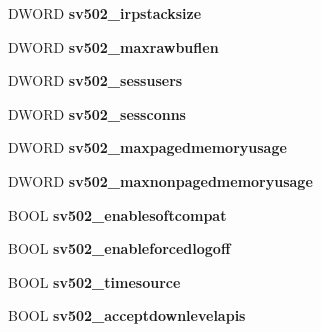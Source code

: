 \begin{DoxyCompactItemize}
D\+W\+O\+RD {\bfseries sv502\+\_\+irpstacksize}
\item 
\mbox{\label{struct___s_e_r_v_e_r___i_n_f_o__502_a532a9819ed0423fb32d903a3991dfd52}} 
D\+W\+O\+RD {\bfseries sv502\+\_\+maxrawbuflen}
\item 
\mbox{\label{struct___s_e_r_v_e_r___i_n_f_o__502_ae02cc028bba937cb16ce235fd617a5f8}} 
D\+W\+O\+RD {\bfseries sv502\+\_\+sessusers}
\item 
\mbox{\label{struct___s_e_r_v_e_r___i_n_f_o__502_af4893949173f745cb89d6b2ef33bbb17}} 
D\+W\+O\+RD {\bfseries sv502\+\_\+sessconns}
\item 
\mbox{\label{struct___s_e_r_v_e_r___i_n_f_o__502_a7daef994026d2732670121c437357ea5}} 
D\+W\+O\+RD {\bfseries sv502\+\_\+maxpagedmemoryusage}
\item 
\mbox{\label{struct___s_e_r_v_e_r___i_n_f_o__502_a8d734ac07ed07311243807cee91140a5}} 
D\+W\+O\+RD {\bfseries sv502\+\_\+maxnonpagedmemoryusage}
\item 
\mbox{\label{struct___s_e_r_v_e_r___i_n_f_o__502_a9693dab3f8fda9d6dc7cf4f2ef1ca65d}} 
B\+O\+OL {\bfseries sv502\+\_\+enablesoftcompat}
\item 
\mbox{\label{struct___s_e_r_v_e_r___i_n_f_o__502_a34eabd6a824c277587fa4ea98ce88aef}} 
B\+O\+OL {\bfseries sv502\+\_\+enableforcedlogoff}
\item 
\mbox{\label{struct___s_e_r_v_e_r___i_n_f_o__502_a7cac5986a3bf300db9f7336c58d58744}} 
B\+O\+OL {\bfseries sv502\+\_\+timesource}
\item 
\mbox{\label{struct___s_e_r_v_e_r___i_n_f_o__502_a193d9ac6a387592ee189593d99a72aa3}} 
B\+O\+OL {\bfseries sv502\+\_\+acceptdownlevelapis}
\item 
\mbox{\label{struct___s_e_r_v_e_r___i_n_f_o__502_a805daee7b3b7462ee0c7a235c91eaf63}} 

\end{DoxyCompactItemize}
